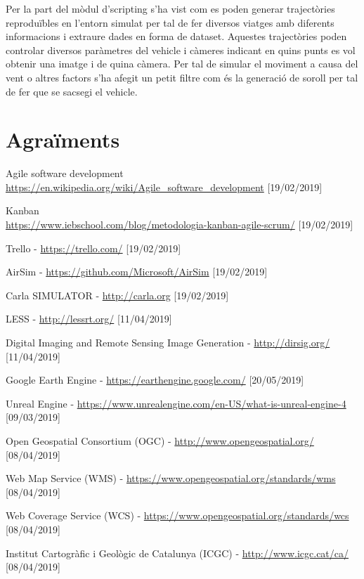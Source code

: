 \documentclass[10pt,a4paper,twocolumn,twoside]{article}
\begin{document}
Per la part del mòdul d'scripting s'ha vist com es poden generar trajectòries reproduïbles en l'entorn simulat per tal de fer diversos viatges amb diferents informacions i extraure dades en forma de dataset. Aquestes trajectòries poden controlar diversos paràmetres del vehicle i càmeres indicant en quins punts es vol obtenir una imatge i de quina càmera. Per tal de simular el moviment a causa del vent o altres factors s'ha afegit un petit filtre com és la generació de soroll per tal de fer que se sacsegi el vehicle.


\section*{Agraïments}

\begin{thebibliography}{11}
Agile software development
\\ \url{https://en.wikipedia.org/wiki/Agile_software_development}
[19/02/2019]

Kanban
\\ \url{https://www.iebschool.com/blog/metodologia-kanban-agile-scrum/} [19/02/2019]

Trello - \url{https://trello.com/} [19/02/2019]

AirSim - \url{https://github.com/Microsoft/AirSim} [19/02/2019]

Carla SIMULATOR - \url{http://carla.org} [19/02/2019]

LESS - \url{http://lessrt.org/} [11/04/2019]

Digital Imaging and Remote Sensing Image Generation - \url{http://dirsig.org/} [11/04/2019]

Google Earth Engine - \url{https://earthengine.google.com/} [20/05/2019]

Unreal Engine - \url{https://www.unrealengine.com/en-US/what-is-unreal-engine-4} [09/03/2019]

Open Geospatial Consortium (OGC) -  \url{http://www.opengeospatial.org/} [08/04/2019]

Web Map Service (WMS) -  \url{https://www.opengeospatial.org/standards/wms} [08/04/2019]

Web Coverage Service (WCS) -  \url{https://www.opengeospatial.org/standards/wcs} [08/04/2019]

Institut Cartogràfic i Geològic de Catalunya (ICGC) - \url{http://www.icgc.cat/ca/} [08/04/2019]


\end{thebibliography}
\end{document}

